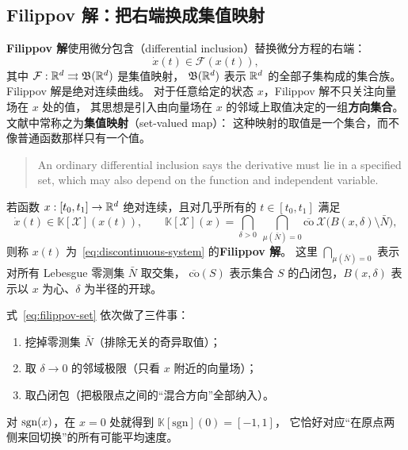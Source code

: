 \subsection{Filippov 解：把右端换成集值映射}

\textbf{Filippov 解}使用微分包含（differential inclusion）替换微分方程的右端：
\begin{equation}\label{eq:filippov-inclusion}
  \dot{x}(t)\in \mathcal{F}(x(t)),
\end{equation}
其中 $\mathcal{F}:\mathbb{R}^d\rightrightarrows\mathfrak{B}(\mathbb{R}^d)$ 是集值映射，
$\mathfrak{B}(\mathbb{R}^d)$ 表示 $\mathbb{R}^d$ 的全部子集构成的集合族。
Filippov 解是绝对连续曲线。
对于任意给定的状态 $x$，Filippov 解不只关注向量场在 $x$ 处的值，
其思想是引入由向量场在 $x$ 的邻域上取值决定的一组\textbf{方向集合}。
文献中常称之为\textbf{集值映射}（set-valued map）：
这种映射的取值是一个集合，而不像普通函数那样只有一个值。

\begin{quote}
An ordinary differential inclusion says the derivative must lie in a specified set, which may also depend on the function and independent variable.
\end{quote}

\begin{definition}[Filippov 解]\label{def:filippov-solution}
  \cite{filippovDifferentialEquationsDiscontinuous1988}
  若函数 $x:[t_0,t_1]\to\mathbb{R}^d$ 绝对连续，且对几乎所有的 $t\in[t_0,t_1]$ 满足
  \begin{equation}\label{eq:filippov-set}
    \dot{x}(t)\in\mathbb{K}[\mathcal{X}](x(t)),
    \qquad
    \mathbb{K}[\mathcal{X}](x)=\bigcap_{\delta>0}\ \bigcap_{\mu(\bar N)=0}
      \overline{\mathrm{co}}\ \mathcal{X}\big(B(x,\delta)\setminus\bar N\big),
  \end{equation}
  则称 $x(t)$ 为~\eqref{eq:discontinuous-system} 的\textbf{Filippov 解}。
  这里 $\bigcap_{\mu(\bar N)=0}$ 表示对所有 Lebesgue 零测集 $\bar N$ 取交集，
  $\overline{\mathrm{co}}(S)$ 表示集合 $S$ 的凸闭包，$B(x,\delta)$ 表示以 $x$ 为心、$\delta$ 为半径的开球。
\end{definition}

\begin{remark}
  式~\eqref{eq:filippov-set} 依次做了三件事：
  \begin{enumerate}
    \item 挖掉零测集 $\bar N$（排除无关的奇异取值）；
    \item 取 $\delta\to0$ 的邻域极限（只看 $x$ 附近的向量场）；
    \item 取凸闭包（把极限点之间的“混合方向”全部纳入）。
  \end{enumerate}
  对 $\operatorname{sgn}(x)$，在 $x=0$ 处就得到 $\mathbb{K}[\mathrm{sgn}](0)=[-1,1]$，
  它恰好对应“在原点两侧来回切换”的所有可能平均速度。
\end{remark}

